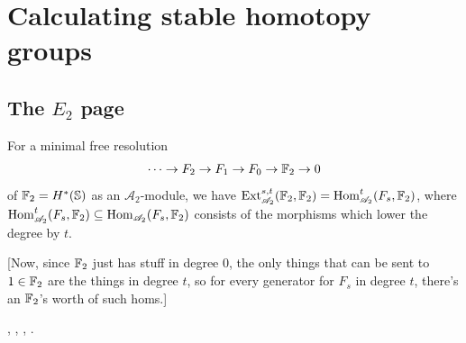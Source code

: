 \documentclass{MetricNotes2023}
\def\bb{\ensuremath\mathbb}
\def\subq{\ensuremath\subseteq}
\def\A{\ensuremath{\mathscr{A}_2}}
\DeclareMathOperator{\Ext}{Ext}
\DeclareMathOperator{\Hom}{Hom}
\begin{document}


\autocite{ass}

\section{Calculating stable homotopy groups}

\subsection{The \(E_2\) page}

\begin{lemma}\label{2503171645shutupitsbeenalongterm}
For a minimal free resolution 
\[\cdots \to F_2 \to F_1 \to F_0 \to \bb{F}_2 \to 0\]
of \(\bb{F}_2=H^*(\bb{S})\) as an \(\A\)-module, we have \(\Ext_{\A}^{s,t}(\bb{F}_2, \bb{F}_2)=\Hom^t_{\A}(F_s, \bb{F}_2)\), where \(\Hom^t_{\A}(F_s, \bb{F}_2)\subq \Hom_{\A}(F_s, \bb{F}_2)\) consists of the morphisms which lower the degree by \(t\).
\end{lemma}

[Now, since \(\bb{F}_2\) just has stuff in degree 0, the only things that can be sent to \(1 \in \bb{F}_2\) are the things in degree \(t\), so for every generator for \(F_s\) in degree \(t\), there's an \(\bb{F}_2\)'s worth of such homs.]

\autocite{stable_homotopy}, \autocite{cobordism}, \autocite{ass}, \autocite{hatcher5}.
\end{document}
